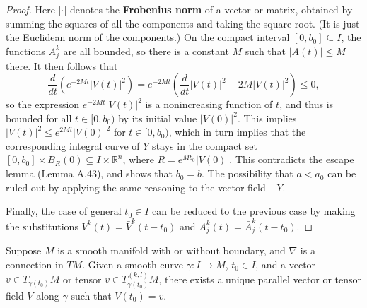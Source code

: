 \begin{proof}
Here $|\cdot|$ denotes the \textbf{Frobenius norm} of a vector or matrix, obtained by summing the squares of all the components and taking the square root. (It is just the Euclidean norm of the components.) On the compact interval $[0, b_0] \subseteq I$, the functions $A^k_j$ are all bounded, so there is a constant $M$ such that $|A(t)| \le M$ there. It then follows that
\[
\frac{d}{dt}(e^{-2Mt}|V(t)|^2) = e^{-2Mt}\left(\frac{d}{dt}|V(t)|^2 - 2M|V(t)|^2\right) \le 0,
\]
so the expression $e^{-2Mt}|V(t)|^2$ is a nonincreasing function of $t$, and thus is bounded for all $t \in [0, b_0)$ by its initial value $|V(0)|^2$. This implies $|V(t)|^2 \le e^{2Mt}|V(0)|^2$ for $t \in [0, b_0)$, which in turn implies that the corresponding integral curve of $Y$ stays in the compact set $[0, b_0] \times \bar{B}_R(0) \subseteq I \times \mathbb{R}^n$, where $R = e^{Mb_0}|V(0)|$. This contradicts the escape lemma (Lemma A.43), and shows that $b_0 = b$. The possibility that $a < a_0$ can be ruled out by applying the same reasoning to the vector field $-Y$.

Finally, the case of general $t_0 \in I$ can be reduced to the previous case by making the substitutions $V^k(t) = \bar{V}^k(t - t_0)$ and $A^k_j(t) = \bar{A}^k_j(t - t_0)$.
\end{proof}

\begin{theorem}
\label{thm:existence-uniqueness-parallel-transport}
Suppose $M$ is a smooth manifold with or without boundary, and $\nabla$ is a connection in $TM$. Given a smooth curve $\gamma: I \to M$, $t_0 \in I$, and a vector $v \in T_{\gamma(t_0)} M$ or tensor $v \in T^{(k,l)}_{\gamma(t_0)} M$, there exists a unique parallel vector or tensor field $V$ along $\gamma$ such that $V(t_0) = v$.
\end{theorem}

